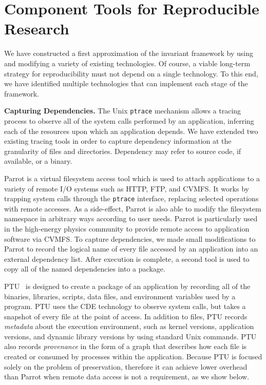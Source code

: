 \section{Component Tools for Reproducible Research}

We have constructed a first approximation of the invariant framework
by using and modifying a variety of existing technologies.  Of course,
a viable long-term strategy for reproducibility must not depend on a single
technology.
To this end, we have identified multiple technologies 
that can implement each stage of the framework.

{\bf Capturing Dependencies.}  The Unix {\tt ptrace} mechanism
allows a tracing process to observe all of the system calls performed by
an application, inferring each of the resources upon which an application
depends.  We have extended two existing tracing tools in order to capture
dependency information at the granularity of files and directories. 
Dependency may refer to source code, if available, or a binary.

Parrot is a virtual filesystem access tool which
is used to attach applications to a variety of remote I/O systems such as HTTP, FTP, and CVMFS. It works by trapping system calls through the {\tt ptrace} interface,
replacing selected operations with remote accesses.  As a side-effect, Parrot is
also able to modify the filesystem namespace in arbitrary ways according to user
needs.  Parrot is particularly used in the high-energy physics community
to provide remote access to application software via CVMFS.
To capture dependencies, we made small modifications to Parrot to record
the logical name of every file accessed by an application into an external
dependency list.  After execution is complete, a second tool is used to copy
all of the named dependencies into a package.

PTU~\cite{pham2014framework} is designed to create a package of an application by recording all of the binaries, libraries, scripts, data files, and environment variables used by a program.   PTU uses the CDE technology to observe system calls, but takes a snapshot of every file at the point of access.  In addition to files, PTU records \emph{metadata} about the execution environment, such as kernel versions, application versions, and dynamic library versions by using standard Unix commands.  PTU also records \emph{provenance} in the form of a graph that describes how each file is created or consumed by processes within the application.  Because PTU is focused solely on the problem of preservation, therefore it can achieve lower overhead than Parrot when remote data access is not a requirement, as we show below.

